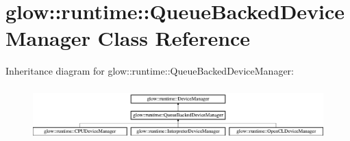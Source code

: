 \hypertarget{classglow_1_1runtime_1_1_queue_backed_device_manager}{}\section{glow\+:\+:runtime\+:\+:Queue\+Backed\+Device\+Manager Class Reference}
\label{classglow_1_1runtime_1_1_queue_backed_device_manager}
Inheritance diagram for glow\+:\+:runtime\+:\+:Queue\+Backed\+Device\+Manager\+:\begin{figure}[H]
\begin{center}
\leavevmode
\includegraphics[height=2.074074cm]{classglow_1_1runtime_1_1_queue_backed_device_manager}
\end{center}
\end{figure}
